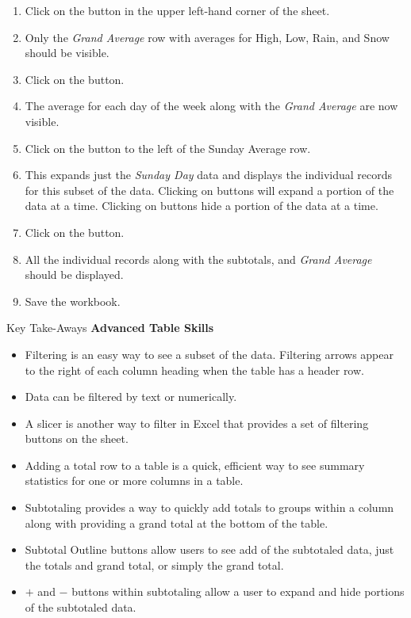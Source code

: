 \begin{enumerate}
	\item Click on the  button in the upper left-hand corner of the sheet.
	\item Only the \textit{Grand Average} row with averages for High, Low, Rain, and Snow should be visible.
	\item Click on the  button.
	\item The average for each day of the week along with the \textit{Grand Average} are now visible.
	\item Click on the  button to the left of the Sunday Average row.
	\item This expands just the \textit{Sunday Day} data and displays the individual records for this subset of the data. Clicking on  buttons will expand a portion of the data at a time. Clicking on  buttons hide a portion of the data at a time.
	\item Click on the  button.
	\item All the individual records along with the subtotals, and \textit{Grand Average} should be displayed. 
	\item Save the  workbook.
\end{enumerate}

\begin{center}
	\begin{tkwbox}{Key Take-Aways}
		\textbf{Advanced Table Skills}
		\\
		\begin{itemize}
			\setlength{\itemsep}{0pt}
			\setlength{\parskip}{0pt}
			\setlength{\parsep}{0pt}

			\item Filtering is an easy way to see a subset of the data. Filtering arrows appear to the right of each column heading when the table has a header row.
			\item Data can be filtered by text or numerically.
			\item A slicer is another way to filter in Excel that provides a set of filtering buttons on the sheet.
			\item Adding a total row to a table is a quick, efficient way to see summary statistics for one or more columns in a table.
			\item Subtotaling provides a way to quickly add totals to groups within a column along with providing a grand total at the bottom of the table.
			\item Subtotal Outline buttons allow users to see add of the subtotaled data, just the totals and grand total, or simply the grand total.
			\item $ + $ and $ - $ buttons within subtotaling allow a user to expand and hide portions of the subtotaled data.
			
		\end{itemize}
	\end{tkwbox}
\end{center}

